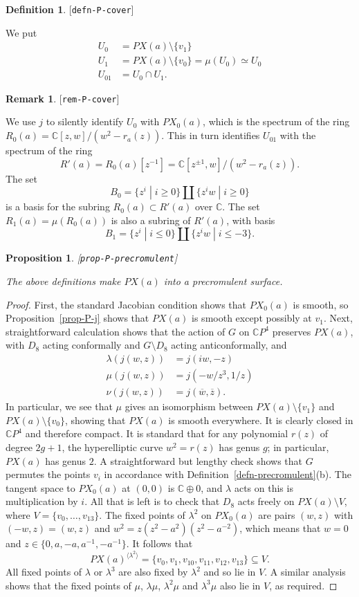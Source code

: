 \documentclass[reqno]{amsart}
\newcommand{\lbl}[1]{\label{#1}\textup{[\texttt{#1}]}\par}
\newcommand{\lbl}{\label}
\newcommand{\lm}        {\lambda}
\newcommand{\C}         {{\mathbb{C}}}
\newcommand{\ov}[1]     {\overline{#1}}
\newcommand{\st}        {\;|\;}
\newcommand{\sm}        {\setminus}
\newcommand{\sse}       {\subseteq}
\renewcommand{\:}{\colon}
\newtheorem{proposition}[theorem]{Proposition}
\theoremstyle{definition}
\newtheorem{remark}[theorem]{Remark}
\newtheorem{definition}[theorem]{Definition}
\begin{document}
\begin{definition}\lbl{defn-P-cover}
 We put
 \begin{align*}
  U_0 &= PX(a)\sm\{v_1\} \\
  U_1 &= PX(a)\sm\{v_0\}=\mu(U_0)\simeq U_0 \\
  U_{01} &= U_0\cap U_1.
 \end{align*}
\end{definition}

\begin{remark}\lbl{rem-P-cover}
 We use $j$ to silently identify $U_0$ with $PX_0(a)$, which is the
 spectrum of the ring $R_0(a)=\C[z,w]/(w^2-r_a(z))$.  This in turn
 identifies $U_{01}$ with the spectrum of the ring
 \[ R'(a) = R_0(a)[z^{-1}] = \C[z^{\pm 1},w]/(w^2-r_a(z)). \]
 The set
 \[ B_0=\{z^i\st i\geq 0\} \amalg\{z^iw\st i\geq 0\} \]
 is a basis for the subring $R_0(a)\subset R'(a)$ over $\C$.  The
 set $R_1(a)=\mu(R_0(a))$ is also a subring of $R'(a)$, with basis
 \[ B_1=\{z^i\st i\leq 0\} \amalg\{z^iw\st i\leq -3\}. \]
\end{remark}

\begin{proposition}\lbl{prop-P-precromulent}
 The above definitions make $PX(a)$ into a precromulent surface.
\end{proposition}
\begin{proof}
 First, the standard Jacobian condition shows that $PX_0(a)$ is
 smooth, so Proposition~\ref{prop-P-j} shows that $PX(a)$ is smooth
 except possibly at $v_1$.  Next, straightforward calculation shows
 that the action of $G$ on $\C P^4$ preserves $PX(a)$, with $D_8$
 acting conformally and $G\sm D_8$ acting anticonformally, and
 \begin{align*}
  \lm(j(w,z)) &= j(iw,-z) \\
  \mu(j(w,z)) &= j(-w/z^3,1/z) \\
  \nu(j(w,z)) &= j(\ov{w},\ov{z}).
 \end{align*}
 In particular, we see that $\mu$ gives an isomorphism between
 $PX(a)\sm\{v_1\}$ and $PX(a)\sm\{v_0\}$, showing that $PX(a)$ is
 smooth everywhere.  It is clearly closed in $\C P^4$ and therefore
 compact.  It is standard that for any polynomial $r(z)$ of degree
 $2g+1$, the hyperelliptic curve $w^2=r(z)$ has genus $g$; in
 particular, $PX(a)$ has genus $2$.  A straightforward but lengthy
 check shows that $G$ permutes the points $v_i$ in accordance with
 Definition~\ref{defn-precromulent}(b).  The tangent space to
 $PX_0(a)$ at $(0,0)$ is $\C\oplus 0$, and $\lm$ acts on this is
 multiplication by $i$.  All that is left is to check that $D_8$ acts
 freely on $PX(a)\sm V$, where $V=\{v_0,\dotsc,v_{13}\}$.  The fixed
 points of $\lm^2$ on $PX_0(a)$ are pairs $(w,z)$ with
 $(-w,z)=(w,z)$ and $w^2=z(z^2-a^2)(z^2-a^{-2})$, which means that
 $w=0$ and $z\in\{0,a,-a,a^{-1},-a^{-1}\}$.  It follows that
 \[ PX(a)^{\langle\lm^2\rangle} =
     \{v_0,v_1,v_{10},v_{11},v_{12},v_{13}\} \sse V.
 \]
 All fixed points of $\lm$ or $\lm^3$ are also fixed by $\lm^2$ and so
 lie in $V$.  A similar analysis shows that the fixed points of $\mu$,
 $\lm\mu$, $\lm^2\mu$ and $\lm^3\mu$ also lie in $V$, as required.
\end{proof}
\end{document}
